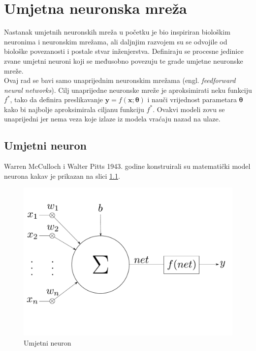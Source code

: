 \documentclass[times, utf8, zavrsni, numeric]{fer}
\renewcommand{\vec}[1]{\mathbf{#1}}
\begin{document}
\chapter{Umjetna neuronska mreža}

Nastanak umjetnih neuronskih mreža u početku je bio inspiriran biološkim 
neuronima i neuronskim mrežama, ali daljnjim razvojem su se odvojile od biološke
povezanosti i postale stvar inženjerstva. Definiraju se procesne jedinice 
zvane umjetni neuroni koji se međusobno povezuju te grade 
umjetne neuronske mreže. 
\\\indent Ovaj rad se bavi samo unaprijednim neuronskim
mrežama (engl. \textit{feedforward neural networks}). Cilj unaprijedne
neuronske mreže je aproksimirati neku funkciju $f^*$, tako da definira
preslikavanje $\vec{y} = f(\vec{x};\pmb{\theta})$ i nauči vrijednost
parametara $\pmb{\theta}$ kako bi najbolje aproksimirala ciljanu funkciju $f^*$.
Ovakvi modeli zovu se unaprijedni jer nema veza koje izlaze iz modela vraćaju
nazad na ulaze.


\section{Umjetni neuron}
Warren McCulloch i Walter Pitts 1943. godine konstruirali su matematički model
neurona kakav je prikazan na slici \ref{fig:umjetni_neuron}.

\begin{figure}[htbp]
	\centering
	\includegraphics[scale=0.3]{moj_umjetni_neuron.pdf}
	\caption{Umjetni neuron}
	\label{fig:umjetni_neuron}
\end{figure}
\end{document}
